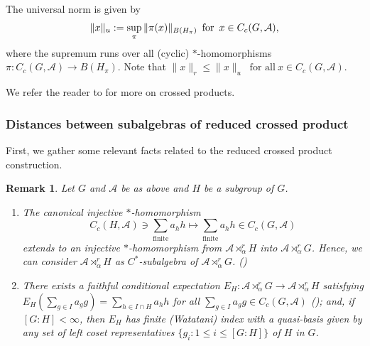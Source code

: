 \documentclass{amsart}
\numberwithin{equation}{section}
\newcommand{\1}{\mathbf{1}}
\newcommand{\mA}{\mathcal{A}}
\newtheorem{remark}[theorem]{Remark}
\begin{document}
The universal norm is given by 
\[
\|x\|_u:= \sup_{\pi}\|\pi(x)\|_{B(H_{\pi})}\, \mbox{\,\,for\,\,}\,x\in C_c(G, \mA),
\]
where the supremum runs over all (cyclic) $*$-homomorphisms $\pi:
C_c(G, \mA)\rightarrow B(H_{\pi})$. Note that 
$
\|x\|_{r}\leq \|x\|_u \ \text{ for all}\  x\in C_c(G, \mA).
$

We refer the reader to \cite{BO} for more on crossed
products.

\subsubsection{Distances between subalgebras of reduced crossed product}
First,  we  gather some relevant facts related to the
reduced crossed product construction.
\begin{remark}\label{crossed-product-facts}
Let $G$ and $\mA$ be as above and $H$ be a subgroup of $G$. 
\begin{enumerate}
\item The canonical injective $*$-homomorphism 
\[
C_c(H, \mA) \ni \sum_{\mathrm{finite}} a_h h \mapsto
\sum_{\mathrm{finite}} a_h h\in C_c(G, \mA)
\]
 extends to an injective $*$-homomorphism from $\mA \rtimes^r_{\alpha} H
 $ into $\mA \rtimes^r_{\alpha} G$. Hence, we can consider
 $\mA \rtimes^r_{\alpha} H$ as $C^*$-subalgebra of
 $\mA \rtimes^r_{\alpha}G$. (\cite[Remark 3.2]{MK})
\item There exists a faithful conditional expectation $E_H: \mA
  \rtimes_{\alpha}^rG \rightarrow \mA \rtimes_{\alpha}^r H$ satisfying
  $E_H(\sum_{g \in I} a_{g}g) = \sum_{h\in I \cap H} a_h h$ for all $
  \sum_{g \in I}a_{g}g\in C_c(G, \mA)$ (\cite[Remark 3.2]{MK}); and,
  if $[G:H] < \infty$, then $E_H$ has finite (Watatani) index with a
  quasi-basis given by any set of left coset representatives $\{g_i: 1
  \leq i \leq [G:H]\}$ of $H$ in $G$.


\end{enumerate}
\end{remark}
\end{document}
